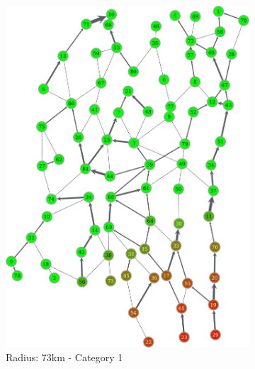 \documentclass[titlepage]{article}
\begin{document}
    \begin{figure}
      \center
      \begin{subfigure}[b]{0.3\textwidth}
        \center
        \includegraphics[width=\textwidth]{figures/right_73_1-crop.pdf}
        \caption{Radius: 73km - Category 1}
        \label{fig:pop_county60}
      \end{subfigure}~
      \begin{subfigure}[b]{0.3\textwidth}
        \center

\end{subfigure}
\end{figure}
\end{document}
